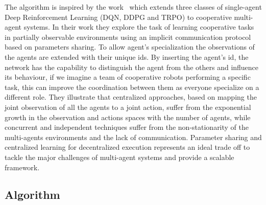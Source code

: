 \documentclass[11pt, a4paper, hidelinks]{report}
\begin{document}
The algorithm is inspired by the work~\citep{ps-ppo-paper} which extends three classes of single-agent Deep Reinforcement Learning (DQN, DDPG and TRPO) to cooperative multi-agent systems.
In their work they explore the task of learning cooperative tasks in partially observable environments using an implicit communication protocol based on parameters sharing.
To allow agent's specialization the observations of the agents are extended with their unique ids.
By inserting the agent's id, the network has the capability to distinguish the agent from the others and influence its behaviour, if we imagine a team of cooperative robots performing a specific task, this can improve the coordination between them as everyone specialize on a different role.
They illustrate that centralized approaches, based on mapping the joint observation of all the agents to a joint action, suffer from the exponential growth in the observation and actions spaces with the number of agents, while concurrent and independent techniques suffer from the non-stationarity of the multi-agents environments and the lack of communication.
Parameter sharing and centralized learning for decentralized execution represents an ideal trade off to tackle the major challenges of multi-agent systems and provide a scalable framework.

\subsection{Algorithm}\label{subsec:algorithm}
\end{document}
